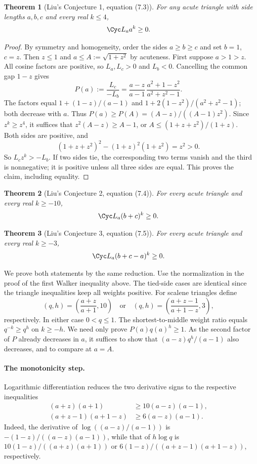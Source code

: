 \documentclass[11pt,a4paper]{article}
\numberwithin{equation}{section}
\newtheorem{theorem}{Theorem}[section]
\theoremstyle{definition}
\theoremstyle{remark}
\begin{document}
\begin{theorem}[Liu's Conjecture 1, equation (7.3)]
For any acute triangle with side lengths $a,b,c$ and every real $k\le4$,
\[
                     \Cyc L_a a^k\ge0.
\]
\end{theorem}
\begin{proof}
By symmetry and homogeneity, order the sides $a\ge b\ge c$ and set $b=1$, $c=z$. Then $z\le1$ and $a\le A:=\sqrt{1+z^2}$ by acuteness. First suppose $a>1>z$. All cosine factors are positive, so $L_a,L_c>0$ and $L_b<0$. Cancelling the common gap $1-z$ gives
\[
 P(a):=\frac{L_c}{-L_b}=
 \frac{a-z}{a-1}\,\frac{a^2+1-z^2}{a^2+z^2-1}.
\]
The factors equal $1+(1-z)/(a-1)$ and $1+2(1-z^2)/(a^2+z^2-1)$; both decrease with $a$. Thus $P(a)\ge P(A)=(A-z)/((A-1)z^2)$. Since $z^k\ge z^4$, it suffices that $z^2(A-z)\ge A-1$, or $A\le(1+z+z^2)/(1+z)$. Both sides are positive, and
\[
       (1+z+z^2)^2-(1+z)^2(1+z^2)=z^2>0.
\]
So $L_cz^k>-L_b$. If two sides tie, the corresponding two terms vanish and the third is nonnegative; it is positive unless all three sides are equal. This proves the claim, including equality.
\end{proof}


\begin{theorem}[Liu's Conjecture 2, equation (7.4)]
For every acute triangle and every real $k\ge-10$,
\[
                        \Cyc L_a(b+c)^k\ge0 .
\]
\end{theorem}
\begin{theorem}[Liu's Conjecture 3, equation (7.5)]
For every acute triangle and every real $k\ge-3$,
\[
                        \Cyc L_a(b+c-a)^k\ge0 .
\]
\end{theorem}
We prove both statements by the same reduction. Use the normalization in the proof of the first Walker inequality above. The tied-side cases are identical since the triangle inequalities keep all weights positive. For scalene triangles define
\[
 (q,h)=\left(\frac{a+z}{a+1},10\right)
    \quad\text{or}\quad
 (q,h)=\left(\frac{a+z-1}{a+1-z},3\right),
\]
respectively. In either case $0<q\le1$. The shortest-to-middle weight ratio equals $q^{-k}\ge q^h$ on $k\ge-h$. We need only prove $P(a)q(a)^h\ge1$. As the second factor of $P$ already decreases in $a$, it suffices to show that $(a-z)q^h/(a-1)$ also decreases, and to compare at $a=A$.

\paragraph{The monotonicity step.}
Logarithmic differentiation reduces the two derivative signs to the respective inequalities
\begin{align*}
 (a+z)(a+1)&\ge10(a-z)(a-1),\\
 (a+z-1)(a+1-z)&\ge6(a-z)(a-1).
\end{align*}
Indeed, the derivative of $\log((a-z)/(a-1))$ is $-(1-z)/((a-z)(a-1))$, while that of $h\log q$ is $10(1-z)/((a+z)(a+1))$ or $6(1-z)/((a+z-1)(a+1-z))$, respectively.
\end{document}
